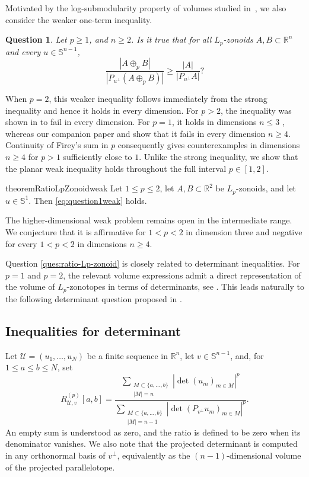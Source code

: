 \documentclass[11pt,a4paper]{amsart}
\theoremstyle{plain}
\newtheorem{ques}[conj]{Question}
\theoremstyle{definition}
\newcommand{\R}{\mathbb R}
\newcommand{\s}{\mathbb S}
\begin{document}
Motivated by the log-submodularity property of volumes studied in~\cite{FHMNWZ-26-I}, we also consider the weaker one-term inequality.

\begin{ques}\label{ques:ratio-Lp-zonoid_weak}
Let $p\geq1$, and $n \geq 2$. Is it true that for all $L_p$-zonoids $A,B\subset\R^n$ and every
$u\in\s^{n-1}$,
\begin{equation}\label{eq:question1weak}
 \frac{|A\oplus_p B|}{|P_{u^\perp}(A\oplus_p B)|}
 \geq
 \frac{|A|}{|P_{u^\perp}A|}?
\end{equation}
\end{ques}
When $p =2$, this weaker inequality follows immediately from the strong inequality and hence it holds in every dimension. For $p>2$, the inequality was shown in \cite{FMMZ-24} to fail in
every dimension. For $p=1$, it holds in dimensions $n\leq 3$
\cite{B-1929,FMMZ-24}, whereas our companion paper
\cite{FHMNWZ-26-I}  and \cite{S-26} show that it fails in every dimension $n\geq 4$.  Continuity of Firey's sum in $p$ consequently gives counterexamples in dimensions $n\geq4$ for $p>1$ sufficiently close to $1$. Unlike the strong inequality, we show that the planar weak inequality holds throughout the full interval $p \in [1,2]$.

\begin{restatable}{theorem}{RatioLpZonoidweak}\label{thm:ratio-Lp-zonoidwekk}
Let $1\leq p\leq2$, let $A,B\subset\R^2$ be $L_p$-zonoids, and let
$u\in\s^1$. Then \eqref{eq:question1weak} holds.
\end{restatable}

The higher-dimensional weak problem remains open in the intermediate range.
We conjecture that it is affirmative for $1<p<2$ in dimension three and
negative for every $1<p<2$ in dimensions $n\geq4$.

Question \ref{ques:ratio-Lp-zonoid} is closely related to determinant inequalities. For $p =1$ and $p =2$, the relevant volume expressions admit a direct representation of the volume of $L_p$-zonotopes in terms of determinants, see \cite{FMMZ-24, GJ-97}. This leads naturally to the following determinant question proposed in \cite{FMMZ-24}.

\subsection{Inequalities for determinant}
Let
$\mathcal U=(u_1,\ldots,u_N)$ be a finite sequence in $\R^n$, let
$v\in\s^{n-1}$, and, for $1\leq a\leq b\leq N$, set
\begin{equation}\label{eq:determinant-ratio-intro}
 R_{\mathcal U,v}^{(p)}[a,b]
 =
 \frac{\displaystyle
   \sum_{\substack{M\subset\{a,\ldots,b\}\\|M|=n}}
   |\det(u_m)_{m\in M}|^p}
 {\displaystyle
   \sum_{\substack{M\subset\{a,\ldots,b\}\\|M|=n-1}}
   |\det(P_{v^\perp}u_m)_{m\in M}|^p}.
\end{equation}
An empty sum is understood as zero, and the ratio is defined to be zero when
its denominator vanishes. We also note that the projected determinant is computed in any orthonormal basis of $v^{\perp}$, equivalently as the $(n-1)$-dimensional volume of the projected parallelotope.
\end{document}
